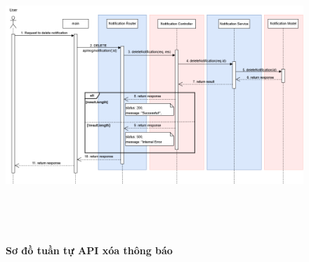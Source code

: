 \begin{figure}[H]
	\centering
	\includegraphics[width=15cm,height=11cm]{Images/api_sequence/noti/deleteNotification.drawio.png}
	\caption[Sơ đồ tuần tự API xóa thông báo]{\bfseries \fontsize{12pt}{0pt}\selectfont Sơ đồ tuần tự API xóa thông báo}
	\label{sequence_diagram_delete_notification}
\end{figure}
